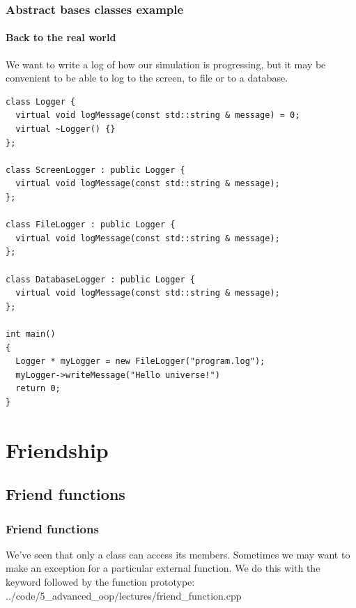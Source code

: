 \documentclass{beamer}
\begin{document}
\begin{frame}[fragile]
  \frametitle{Abstract bases classes example}
  \framesubtitle{Back to the real world}
  We want to write a log of how our simulation is progressing, but it may be convenient to be able to log to the screen, to file or to a database.
  \begin{lstlisting}[basicstyle=\ttfamily\fontsize{7}{8}\selectfont]
class Logger {
  virtual void logMessage(const std::string & message) = 0;
  virtual ~Logger() {}
};

class ScreenLogger : public Logger {
  virtual void logMessage(const std::string & message);
};

class FileLogger : public Logger {
  virtual void logMessage(const std::string & message);
};

class DatabaseLogger : public Logger {
  virtual void logMessage(const std::string & message);
};

int main()
{
  Logger * myLogger = new FileLogger("program.log");
  myLogger->writeMessage("Hello universe!")
  return 0;
}
  \end{lstlisting}

\end{frame}


\section{Friendship}

\subsection{Friend functions}

\begin{frame}[fragile]
  \frametitle{Friend functions}
  
  We've seen that only a class can access its  members.  Sometimes we may want to make an exception for a particular external function.  We do this with the  keyword followed by the function prototype:
  \pause
    {../code/5_advanced_oop/lectures/friend_function.cpp}

\end{frame}
\end{document}

